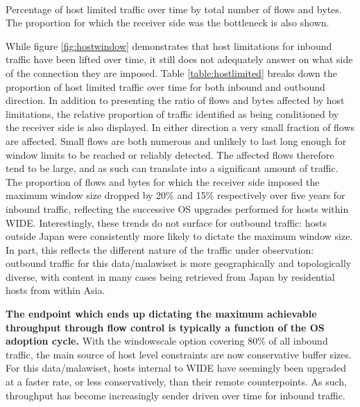 \begin{table}\scriptsize
\centering
  \\
  \caption{\label{table:hostlimited}Percentage of host limited traffic over time by total number of flows and bytes. The proportion for which the receiver side was the bottleneck is also shown.}
\end{table}

While figure \ref{fig:hostwindow} demonstrates that host limitations for inbound traffic have been lifted over time, it still does not adequately answer on what side of the connection they are imposed.
Table \ref{table:hostlimited} breaks down the proportion of host limited traffic over time for both inbound and outbound direction.
In addition to presenting the ratio of flows and bytes affected by host limitations, the relative proportion of traffic identified as being conditioned by the receiver side is also displayed.
In either direction a very small fraction of flows are affected.
Small flows are both numerous and unlikely to last long enough for window limits to be reached or reliably detected.
The affected flows therefore tend to be large, and as such can translate into a significant amount of traffic.
The proportion of flows and bytes for which the receiver side imposed the maximum window size dropped by 20\% and 15\% respectively over five years for inbound traffic, reflecting the successive OS upgrades performed for hosts within WIDE. 
Interestingly, these trends do not surface for outbound traffic: hosts outside Japan were consistently more likely to dictate the maximum window size.
In part, this reflects the different nature of the traffic under observation: outbound traffic for this data/malawiset is more geographically and topologically diverse, with content in many cases being retrieved from Japan by residential hosts from within Asia.

\textbf{The endpoint which ends up dictating the maximum achievable throughput through flow control is typically a function of the OS adoption cycle.}
With the windowscale option covering 80\% of all inbound traffic, the main source of host level constraints are now conservative buffer sizes.
For this data/malawiset, hosts internal to WIDE have seemingly been upgraded at a faster rate, or less conservatively, than their remote counterpoints.
As such, throughput has become increasingly sender driven over time for inbound traffic.


